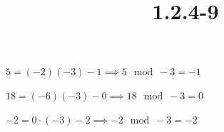 \documentclass{article}
\title{1.2.4-9}
\begin{document}
\maketitle

$5 = (-2)(-3) - 1 \implies 5 \mod -3 = -1$

$18 = (-6)(-3) - 0 \implies 18 \mod -3 = 0$

$-2 = 0 \cdot (-3) - 2 \implies -2 \mod -3 = -2$
\end{document}
